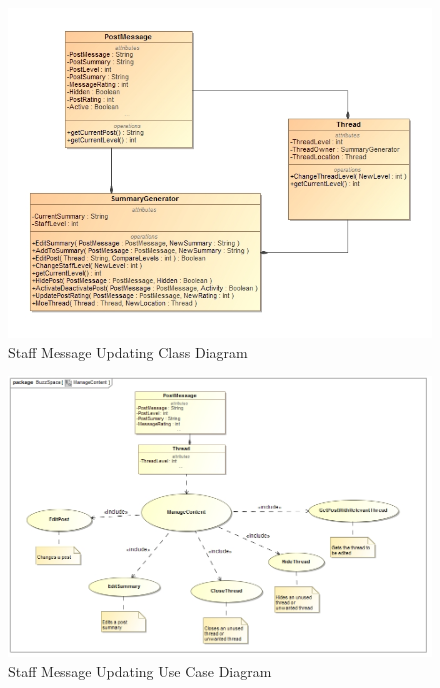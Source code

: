 \documentclass[11pt]{article}
\begin{document}
\begin{enumerate}
\begin{itemize}
 \graphicspath{ {../Diagrams/Andrew/} }
	\begin{figure}[H]		
		\includegraphics[scale=0.5]{B2ClassDiagram.png}
		\caption{Staff Message Updating Class Diagram}
	\end{figure}
	\begin{figure}[H]	
		\includegraphics[scale=0.5]{B2UseCase.png}
		\caption{Staff Message Updating Use Case Diagram}
	\end{figure}
	\begin{figure}[H]		

\end{figure}
\end{itemize}
\end{enumerate}
\end{document}
